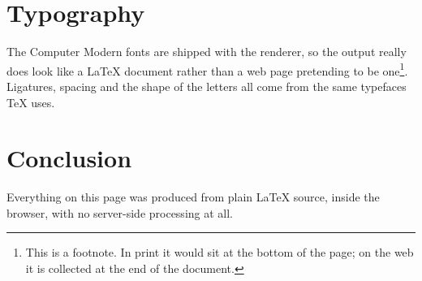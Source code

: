 \documentclass{article}
\begin{document}
\section{Typography}

The Computer Modern fonts are shipped with the renderer, so the output really
does look like a \LaTeX{} document rather than a web page pretending to be
one\footnote{This is a footnote. In print it would sit at the bottom of the
page; on the web it is collected at the end of the document.}. Ligatures,
spacing and the shape of the letters all come from the same typefaces \TeX{}
uses.

\section{Conclusion}

Everything on this page was produced from plain \LaTeX{} source, inside the
browser, with no server-side processing at all.
\end{document}
